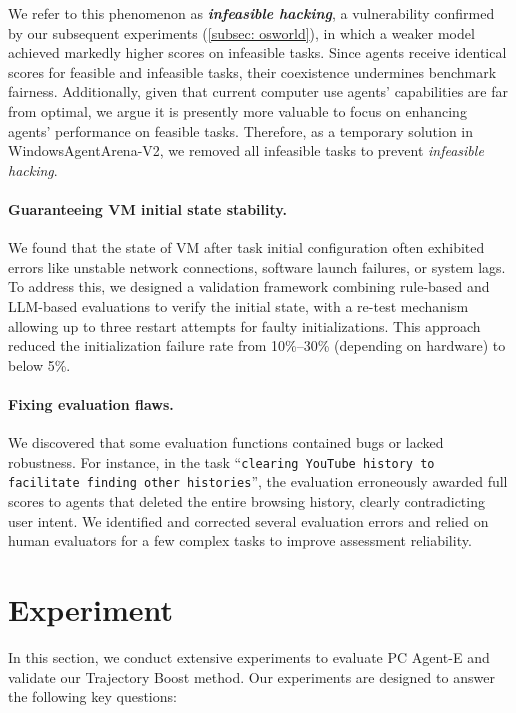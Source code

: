 \documentclass{article} %
\begin{document}
We refer to this phenomenon as \textbf{\textit{infeasible hacking}}, a vulnerability confirmed by our subsequent experiments (\autoref{subsec: osworld}), in which a weaker model achieved markedly higher scores on infeasible tasks. Since agents receive identical scores for feasible and infeasible tasks, their coexistence undermines benchmark fairness. Additionally, given that current computer use agents' capabilities are far from optimal, we argue it is presently more valuable to focus on enhancing agents' performance on feasible tasks. Therefore, as a temporary solution in WindowsAgentArena-V2, we removed all infeasible tasks to prevent \textit{infeasible hacking}.


\paragraph{Guaranteeing VM initial state stability.} We found that the state of VM after task initial configuration often exhibited errors like unstable network connections, software launch failures, or system lags. To address this, we designed a validation framework combining rule-based and LLM-based evaluations to verify the initial state, with a re-test mechanism allowing up to three restart attempts for faulty initializations. This approach reduced the initialization failure rate from 10\%–30\% (depending on hardware) to below 5\%.


\paragraph{Fixing evaluation flaws.} 
We discovered that some evaluation functions contained bugs or lacked robustness. For instance, in the task ``\texttt{clearing YouTube history to facilitate finding other histories}'', the evaluation erroneously awarded full scores to agents that deleted the entire browsing history, clearly contradicting user intent. We identified and corrected several evaluation errors and relied on human evaluators for a few complex tasks to improve assessment reliability.

\section{Experiment}
\label{sec: experiment}

In this section, we conduct extensive experiments to evaluate PC Agent-E and validate our Trajectory Boost method. Our experiments are designed to answer the following key questions:
\end{document}
